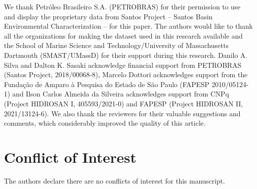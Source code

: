 \documentclass[draft]{agujournal2019}
\begin{document}
\acknowledgments
We thank Petróleo Brasileiro S.A. (PETROBRAS) for their permission to use and display the proprietary data from Santos Project – Santos Basin Environmental Characterization – for this paper. The authors would like to thank all the organizations for making the dataset used in this research available and the School of Marine Science and Technology/University of Massachusetts Dartmouth (SMAST/UMassD) for their support during this research. Danilo A. Silva and Dalton K. Sasaki acknowledge financial support from PETROBRAS (Santos Project, 2018/00068-8), Marcelo Dottori acknowledges support from the Fundação de Amparo à Pesquisa do Estado de São Paulo (FAPESP 2010/05124-1) and Ilson Carlos Almeida da Silveira acknowledges support from CNPq (Project HIDROSAN I, 405593/2021-0) and FAPESP (Project HIDROSAN II, 2021/13124-6). We also thank the reviewers for their valuable suggestions and comments, which considerably improved the quality of this article.

\section*{Conflict of Interest}

The authors declare there are no conflicts of interest for this manuscript.


%
\end{document}
